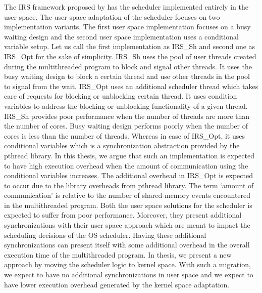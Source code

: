 The IRS framework proposed by \citet{metzler2017quick} has the scheduler implemented entirely in the user space. 
The user space adaptation of the scheduler focuses on two implementation variants. 
The first user space implementation focuses on a busy waiting design and the second user space implementation uses a conditional variable setup. 
Let us call the first implementation as IRS\_Sh and second one as IRS\_Opt for the sake of simplicity. 
IRS\_Sh uses the pool of user threads created during the multithreaded program to block and signal other threads. 
It uses the busy waiting design to block a certain thread and use other threads in the pool to signal from the wait. 
IRS\_Opt uses an additional scheduler thread which takes care of requests for blocking or unblocking certain thread. 
It uses condition variables to address the blocking or unblocking functionality of a given thread. 
IRS\_Sh provides poor performance when the number of threads are more than the number of cores. 
Busy waiting design performs poorly when the number of cores is less than the number of threads. 
Whereas in case of IRS\_Opt, it uses conditional variables which is a synchronization abstraction provided by the pthread library. 
In this thesis, we argue that such an implementation is expected to have high execution overhead when the amount of communication using the conditional variables increases. 
The additional overhead in IRS\_Opt is expected to occur due to the library overheads from pthread library. 
The term `amount of communication' is relative to the number of shared-memory events encountered in the multithreaded program. 
Both the user space solutions for the scheduler is expected to suffer from poor performance. 
Moreover, they present additional synchronizations with their user space approach which are meant to impact the scheduling decisions of the OS scheduler. 
Having these additional synchronizations can present itself with some additional overhead in the overall execution time of the multithreaded program. 
In thesis, we present a new approach by moving the scheduler logic to kernel space. 
With such a migration, we expect to have no additional synchronizations in user space and we expect to have lower execution overhead generated by the kernel space adaptation.  

